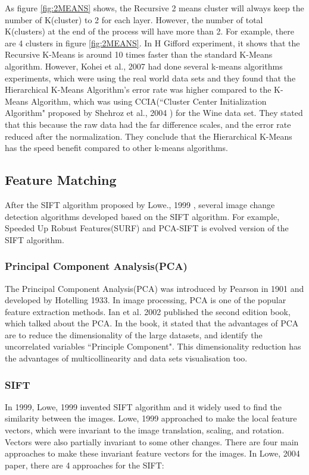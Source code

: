 \documentclass[runningheads,a4paper]{llncs}
\newcommand{\naoki}{\todo[author=NK,color=yellow,inline]}
\begin{document}
As figure \ref{fig:2MEANS} shows, the Recursive 2 means cluster will always keep the number of K(cluster) to 2 for each layer. However, the number of total K(clusters) at the end of the process will have more than 2. For example, there are 4 clusters in figure \ref{fig:2MEANS}. 
In H Gifford \cite{giffordhierarchical} experiment, it shows that the Recursive K-Means is around 10 times faster than the standard K-Means algorithm. However, Kohei et al., 2007 \cite{arai2007hierarchical} had done several k-means algorithms experiments, which were using the real world data sets and they found that the Hierarchical K-Means Algorithm's error rate was higher compared to the K-Means Algorithm, which was using CCIA(``Cluster Center Initialization Algorithm" proposed by Shehroz et al., 2004 \cite{khan2004cluster} ) for the Wine data set. They stated that this because the raw data had the far difference scales, and the error rate reduced after the normalization. They conclude that the Hierarchical K-Means has the speed benefit compared to other k-means algorithms. 
\naoki{Edit}
\subsection{Feature Matching} 
After the SIFT algorithm proposed by Lowe., 1999 \cite{790410}, several image change detection algorithms developed based on the SIFT algorithm. For example,  Speeded Up Robust Features(SURF)\cite{bay2006surf} and PCA-SIFT\cite{1315206} is evolved version of the SIFT algorithm. 

\subsubsection{Principal  Component  Analysis(PCA)}
The Principal  Component  Analysis(PCA) was introduced by Pearson in 1901 and developed by Hotelling 1933. In image processing, PCA is one of the popular feature extraction methods. Ian et al. 2002\cite{jolliffe2002principal} published the second edition book, which talked about the PCA. In the book, it stated that the advantages of PCA are to reduce the dimensionality of the large datasets, and identify the uncorrelated variables ``Principle Component".  This dimensionality reduction has the advantages of multicollinearity and data sets visualisation too. \\


\subsubsection{SIFT}
In 1999, Lowe, 1999 \cite{790410} invented SIFT algorithm and it widely used to find the similarity between the images. Lowe, 1999 \cite{790410} approached to make the local feature vectors, which were invariant to the image translation, scaling, and rotation. Vectors were also partially invariant to some other changes. There are four main approaches to make these invariant feature vectors for the images. In Lowe, 2004 \cite{Lowe2004} paper, there are 4 approaches for the SIFT:
\end{document}
